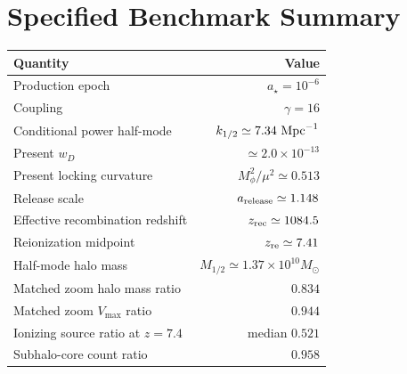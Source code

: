 \chapter{Specified Benchmark Summary}\begin{longtable}{@{}P{0.48\textwidth}r@{}}\toprule Quantity & Value\\\midrule Production epoch & $a_\star=10^{-6}$\\ Coupling & $\gamma=16$\\ Conditional power half-mode & $k_{1/2}\simeq7.34\ {\rm Mpc}^{-1}$\\ Present $w_D$ & $\simeq2.0\times10^{-13}$\\ Present locking curvature & $M_\phi^2/\mu^2\simeq0.513$\\ Release scale & $a_{\rm release}\simeq1.148$\\ Effective recombination redshift & $z_{\rm rec}\simeq1084.5$\\ Reionization midpoint & $z_{\rm re}\simeq7.41$\\ Half-mode halo mass & $M_{1/2}\simeq1.37\times10^{10}M_\odot$\\ Matched zoom halo mass ratio & $0.834$\\ Matched zoom $V_{\max}$ ratio & $0.944$\\ Ionizing source ratio at $z=7.4$ & median $0.521$\\ Subhalo-core count ratio & $0.958$\\\bottomrule\end{longtable}
